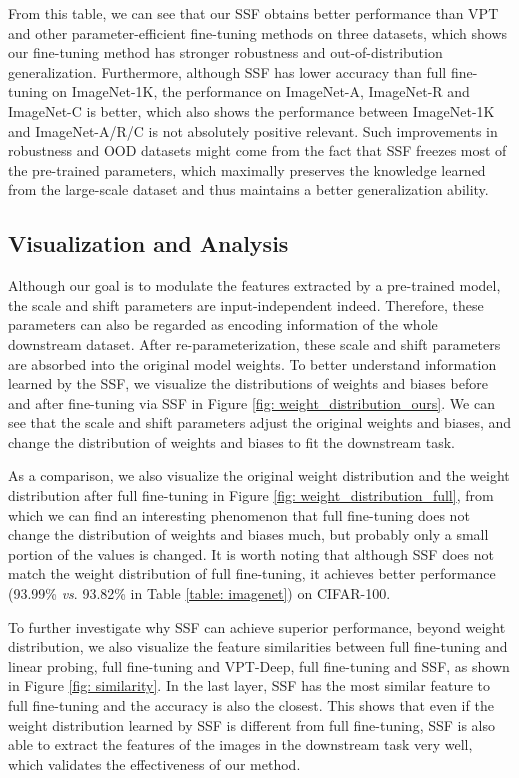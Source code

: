 From this table, we can see that our SSF obtains better performance than VPT and other parameter-efficient fine-tuning methods on three datasets, which shows our fine-tuning method has stronger robustness and out-of-distribution generalization. Furthermore, although SSF has lower accuracy than full fine-tuning on ImageNet-1K, the performance on ImageNet-A, ImageNet-R and ImageNet-C is better, which also shows the performance between ImageNet-1K and ImageNet-A/R/C is not absolutely positive relevant. Such improvements in robustness and OOD datasets might come from the fact that SSF freezes most of the pre-trained parameters, which maximally preserves the knowledge learned from the large-scale dataset and thus maintains a better generalization ability. 

\subsection{Visualization and Analysis}

Although our goal is to modulate the features extracted by a pre-trained model, the scale and shift parameters are input-independent indeed. Therefore, these parameters can also be regarded as encoding information of the whole downstream dataset. After re-parameterization, these scale and shift parameters are absorbed into the original model weights. To better understand information learned by the SSF, we visualize the distributions of weights and biases before and after fine-tuning via SSF in Figure \ref{fig: weight_distribution_ours}. We can see that the scale and shift parameters adjust the original weights and biases, and change the distribution of weights and biases to fit the downstream task. 

As a comparison, we also visualize the original weight distribution and the weight distribution after full fine-tuning in Figure \ref{fig: weight_distribution_full}, from which we can find an interesting phenomenon that full fine-tuning does not change the distribution of weights and biases much, but probably only a small portion of the values is changed. It is worth noting that although SSF does not match the weight distribution of full fine-tuning, it achieves better performance (93.99\% \emph{vs}. 93.82\% in Table \ref{table: imagenet}) on CIFAR-100.

To further investigate why SSF can achieve superior performance, beyond weight distribution, we also visualize the feature similarities between full fine-tuning and linear probing, full fine-tuning and VPT-Deep, full fine-tuning and SSF, as shown in Figure \ref{fig: similarity}. In the last layer, SSF has the most similar feature to full fine-tuning and the accuracy is also the closest. This shows that even if the weight distribution learned by SSF is different from full fine-tuning, SSF is also able to extract the features of the images in the downstream task very well, which validates the effectiveness of our method. 

